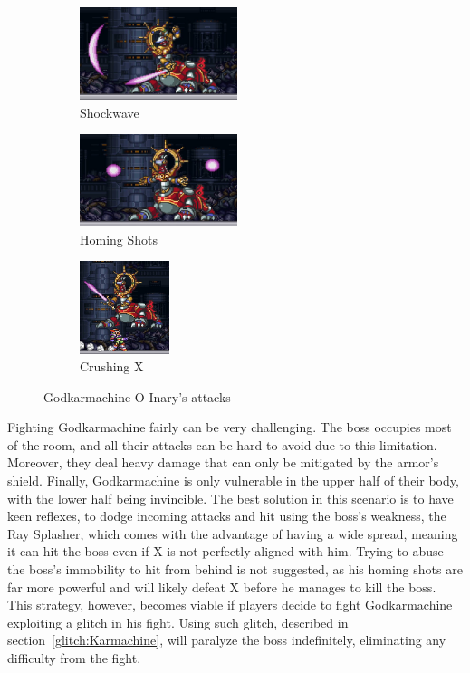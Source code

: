 \begin{figure}[htp]
	\centering
	\ContinuedFloat
	\begin{subfigure}{.4\linewidth}
		\centering
		\includegraphics[height=2.7cm]{figures/X3/Doppler_stages/gkarma_saber.jpg}
		\caption{Shockwave}
	\end{subfigure}
	\begin{subfigure}{.4\linewidth}
		\centering
		\includegraphics[height=2.7cm]{figures/X3/Doppler_stages/gkarma_sphere.jpg}
		\caption{Homing Shots}
	\end{subfigure}
	\begin{subfigure}{\linewidth}
		\centering
		\includegraphics[height=2.7cm]{figures/X3/Doppler_stages/gkarma_crush.jpg}
		\caption{Crushing X}
	\end{subfigure}
	\caption{Godkarmachine O Inary's attacks}
\end{figure}

Fighting Godkarmachine fairly can be very challenging. The boss occupies most of the room, and all their attacks can be hard to avoid due to this limitation. Moreover, they deal heavy damage that can only be mitigated by the armor's shield. Finally, Godkarmachine is only vulnerable in the upper half of their body, with the lower half being invincible. The best solution in this scenario is to have keen reflexes, to dodge incoming attacks and hit using the boss's weakness, the Ray Splasher, which comes with the advantage of having a wide spread, meaning it can hit the boss even if X is not perfectly aligned with him. Trying to abuse the boss's immobility to hit from behind is not suggested, as his homing shots are far more powerful and will likely defeat X before he manages to kill the boss. This strategy, however, becomes viable if players decide to fight Godkarmachine exploiting a glitch in his fight. Using such glitch, described in section~\ref{glitch:Karmachine}, will paralyze the boss indefinitely, eliminating any difficulty from the fight. 

